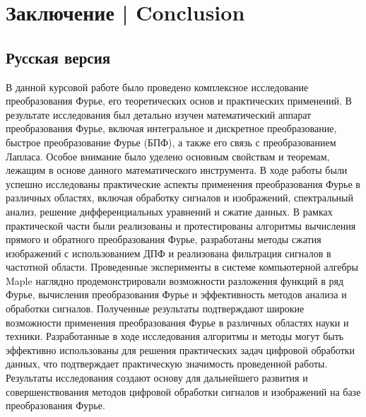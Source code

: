 \nocite{*}

\newpage
\section*{Заключение | Conclusion}

\subsection*{Русская версия}
В данной курсовой работе было проведено
комплексное исследование преобразования Фурье,
 его теоретических основ и практических применений.
  В результате исследования был детально изучен математический аппарат преобразования Фурье,
   включая интегральное и дискретное преобразование, быстрое преобразование Фурье (БПФ),
    а также его связь с преобразованием Лапласа. Особое внимание было уделено основным свойствам и теоремам,
     лежащим в основе данного математического инструмента. В ходе работы были успешно исследованы практические
      аспекты применения преобразования Фурье в различных областях, включая обработку сигналов и изображений,
       спектральный анализ, решение дифференциальных уравнений и сжатие данных. В рамках практической части 
       были реализованы и протестированы алгоритмы вычисления прямого и обратного преобразования Фурье, 
       разработаны методы сжатия изображений с использованием ДПФ и реализована фильтрация сигналов в частотной области. 
       Проведенные эксперименты в системе компьютерной алгебры Maple наглядно продемонстрировали возможности разложения функций
        в ряд Фурье, вычисления преобразования Фурье и эффективность методов анализа и обработки сигналов.
         Полученные результаты подтверждают широкие возможности применения преобразования Фурье в различных
          областях науки и техники. Разработанные в ходе исследования алгоритмы и методы могут быть 
          эффективно использованы для решения практических задач цифровой обработки данных, что подтверждает
           практическую значимость проведенной работы. Результаты исследования создают основу для дальнейшего
            развития и совершенствования методов цифровой обработки сигналов и изображений на базе преобразования Фурье.

